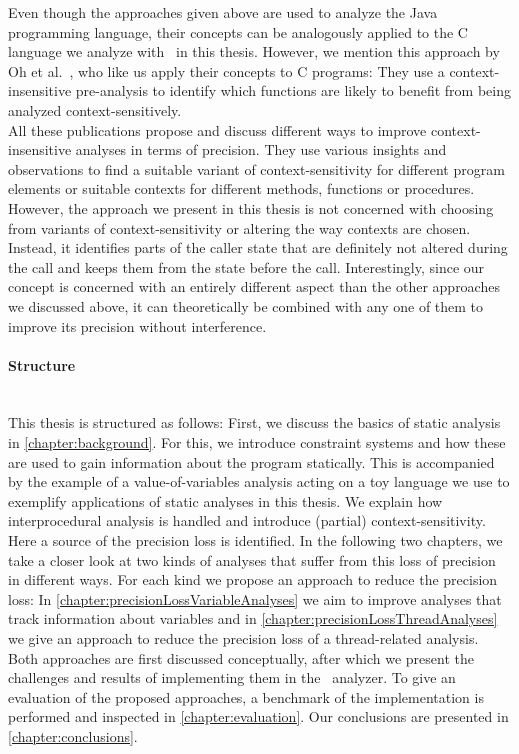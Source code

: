   Even though the approaches given above are used to analyze the Java programming language, their concepts can be analogously applied to the C language we analyze with \gob\ in this thesis. However, we mention this approach by Oh et al.~\parencite{oh2014selective}, who like us apply their concepts to C programs: They use a context-insensitive pre-analysis to identify which functions are likely to benefit from being analyzed context-sensitively.\\
  All these publications propose and discuss different ways to improve context-insensitive analyses in terms of precision. They use various insights and observations to find a suitable variant of context-sensitivity for different program elements or suitable contexts for different methods, functions or procedures. However, the approach we present in this thesis is not concerned with choosing from variants of context-sensitivity or altering the way contexts are chosen. Instead, it identifies parts of the caller state that are definitely not altered during the call and keeps them from the state before the call. Interestingly, since our concept is concerned with an entirely different aspect than the other approaches we discussed above, it can theoretically be combined with any one of them to improve its precision without interference.

  \paragraph{Structure}\mbox{}\\
  This thesis is structured as follows: First, we discuss the basics of static analysis in \autoref{chapter:background}. For this, we introduce constraint systems and how these are used to gain information about the program statically. This is accompanied by the example of a value-of-variables analysis acting on a toy language we use to exemplify applications of static analyses in this thesis. We explain how interprocedural analysis is handled and introduce (partial) context-sensitivity. Here a source of the precision loss is identified. In the following two chapters, we take a closer look at two kinds of analyses that suffer from this loss of precision in different ways. For each kind we propose an approach to reduce the precision loss: In \autoref{chapter:precisionLossVariableAnalyses} we aim to improve analyses that track information about variables and in \autoref{chapter:precisionLossThreadAnalyses} we give an approach to reduce the precision loss of a thread-related analysis. Both approaches are first discussed conceptually, after which we present the challenges and results of implementing them in the \gob\ analyzer. To give an evaluation of the proposed approaches, a benchmark of the implementation is performed and inspected in \autoref{chapter:evaluation}. Our conclusions are presented in \autoref{chapter:conclusions}.
